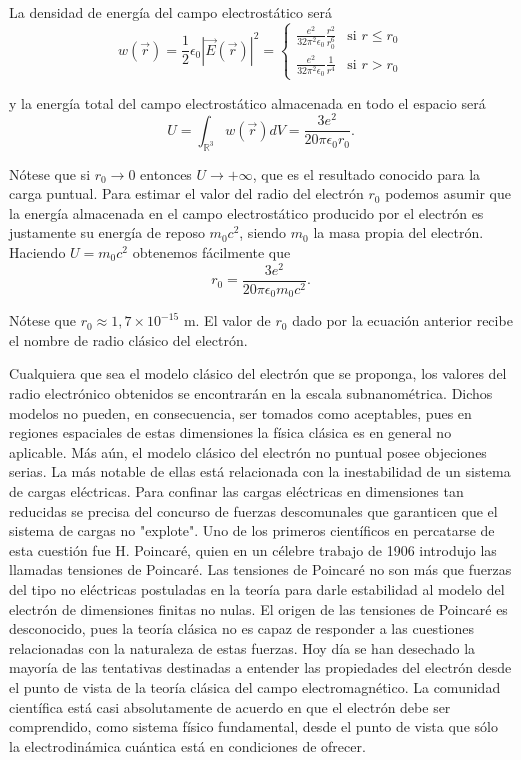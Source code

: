 \documentclass[12pt,a4paper]{book}
\begin{document}
La densidad de energía del campo electrostático será
\begin{equation}
w(\vec{r}) = \frac{1}{2}\epsilon_0|\vec{E}(\vec{r})|^2 = 
\begin{cases}
\frac{e^2}{32\pi^2\epsilon_0}\frac{r^2}{r_0^6} & \text{si } r \leq r_0 \\
\frac{e^2}{32\pi^2\epsilon_0}\frac{1}{r^4} & \text{si } r > r_0
\end{cases}
\end{equation}

y la energía total del campo electrostático almacenada en todo el espacio será
\begin{equation}
U = \int_{\mathbb{R}^3} w(\vec{r})dV = \frac{3e^2}{20\pi\epsilon_0 r_0}.
\end{equation}

Nótese que si $r_0 \rightarrow 0$ entonces $U \rightarrow +\infty$, que es el resultado conocido para la carga puntual. Para estimar el valor del radio del electrón $r_0$ podemos asumir que la energía almacenada en el campo electrostático producido por el electrón es justamente su energía de reposo $m_0c^2$, siendo $m_0$ la masa propia del electrón. Haciendo $U = m_0c^2$ obtenemos fácilmente que
\begin{equation}
r_0 = \frac{3e^2}{20\pi\epsilon_0 m_0c^2}.
\end{equation}

Nótese que $r_0 \approx 1,7 \times 10^{-15}$ m. El valor de $r_0$ dado por la ecuación anterior recibe el nombre de radio clásico del electrón.

Cualquiera que sea el modelo clásico del electrón que se proponga, los valores del radio electrónico obtenidos se encontrarán en la escala subnanométrica. Dichos modelos no pueden, en consecuencia, ser tomados como aceptables, pues en regiones espaciales de estas dimensiones la física clásica es en general no aplicable. Más aún, el modelo clásico del electrón no puntual posee objeciones serias. La más notable de ellas está relacionada con la inestabilidad de un sistema de cargas eléctricas. Para confinar las cargas eléctricas en dimensiones tan reducidas se precisa del concurso de fuerzas descomunales que garanticen que el sistema de cargas no "explote". Uno de los primeros científicos en percatarse de esta cuestión fue H. Poincaré, quien en un célebre trabajo de 1906 introdujo las llamadas tensiones de Poincaré. Las tensiones de Poincaré no son más que fuerzas del tipo no eléctricas postuladas en la teoría para darle estabilidad al modelo del electrón de dimensiones finitas no nulas. El origen de las tensiones de Poincaré es desconocido, pues la teoría clásica no es capaz de responder a las cuestiones relacionadas con la naturaleza de estas fuerzas. Hoy día se han desechado la mayoría de las tentativas destinadas a entender las propiedades del electrón desde el punto de vista de la teoría clásica del campo electromagnético. La comunidad científica está casi absolutamente de acuerdo en que el electrón debe ser comprendido, como sistema físico fundamental, desde el punto de vista que sólo la electrodinámica cuántica está en condiciones de ofrecer.
\end{document}
